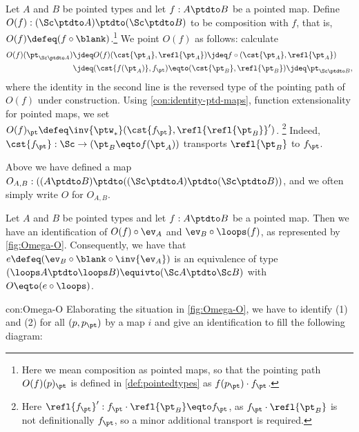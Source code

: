 \begin{definition}\label{def:O-mega}
Let $A$ and $B$ be pointed types and 
let $f: A\ptdto B$ be a pointed map.
Define $O(f):(\Sc\ptdto A)\ptdto(\Sc\ptdto B)$ to be composition with $f$,
that is, $O(f)\defeq (f\circ\blank)$.\footnote{%
Here we mean composition as pointed maps,
so that the pointing path $O(f)(p)_\pt$ is defined in 
\cref{def:pointedtypes} as $f(p_\pt)\cdot f_\pt$.}
We point $O(f)$ as follows: calculate 
\begin{align*}
  O(f)(\pt_{\Sc\ptdto A})
  &\jdeq O(f)(\cst{\pt_A},\refl{\pt_A})
   \jdeq f\circ (\cst{\pt_A},\refl{\pt_A})
\\
  &\jdeq (\cst{f(\pt_A)},f_\pt)
  \eqto (\cst{\pt_B},\refl{\pt_B})
   \jdeq\pt_{\Sc\ptdto B},
\end{align*}
where the identity in the second line is the reversed type of 
the pointing path of $O(f)$ under construction.
Using \cref{con:identity-ptd-maps}, function extensionality for pointed maps,
we set $O(f)_\pt\defeq\inv{\ptw_*}(\cst{f_\pt},\refl{\refl{\pt_B}}')$.%
\footnote{Here $\refl{f_\pt}' : 
f_\pt \cdot \refl{\pt_B} \eqto f_\pt$, 
as $f_\pt \cdot \refl{\pt_B}$ is not definitionally $f_\pt$,
so a minor additional transport is required.}
Indeed, $\cst{f_\pt} : \Sc\to(\pt_B \eqto f(\pt_A))$ 
transports $\refl{\pt_B}$ to $f_\pt$.
\end{definition}
Above we have defined a 
map $O_{A,B}: ((A\ptdto B)\ptdto((\Sc\ptdto A)\ptdto(\Sc\ptdto B))$,
and we often simply write $O$ for $O_{A,B}$.

\begin{construction}\label{con:Omega-O}
Let $A$ and $B$ be pointed types and 
let $f: A\ptdto B$ be a pointed map.
Then we have an identification of $O(f)\circ \ev_A$ 
and ${\ev_B} \circ {\loops(f)}$, as represented by \cref{fig:Omega-O}.
Consequently, we have that $e\defeq(\ev_B\circ{{\blank}\circ\inv{\ev_A}})$
is an equivalence of type 
$(\loops A\ptdto\loops B)\equivto(\Sc A\ptdto\Sc B)$
with $O \eqto (e\circ \loops)$. 
\end{construction}
\begin{implementation}{con:Omega-O}
Elaborating the situation in \cref{fig:Omega-O}, we have to
identify (1) and (2) for all $(p,p_\pt)$ by a map $i$ and
give an identification to fill the following diagram: 


\end{implementation}

